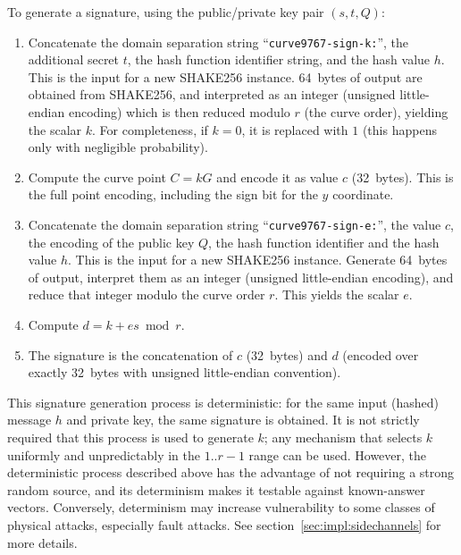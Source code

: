 \documentclass{llncs}
\begin{document}
To generate a signature, using the public/private key pair $(s,t,Q)$:
\begin{enumerate}

    \item Concatenate the domain separation string
    ``\verb+curve9767-sign-k:+'', the additional secret $t$, the hash
    function identifier string, and the hash value $h$. This is the
    input for a new SHAKE256 instance. 64~bytes of output are obtained
    from SHAKE256, and interpreted as an integer (unsigned little-endian
    encoding) which is then reduced modulo $r$ (the curve order),
    yielding the scalar $k$. For completeness, if $k = 0$, it is
    replaced with $1$ (this happens only with negligible probability).

    \item Compute the curve point $C = kG$ and encode it as value $c$
    (32~bytes). This is the full point encoding, including the sign bit
    for the $y$ coordinate.

    \item \label{proc:sign:e}Concatenate the domain separation string
    ``\verb+curve9767-sign-e:+'', the value $c$, the encoding of the
    public key $Q$, the hash function identifier and the hash value $h$.
    This is the input for a new SHAKE256 instance. Generate 64~bytes of
    output, interpret them as an integer (unsigned little-endian encoding),
    and reduce that integer modulo the curve order $r$. This yields the
    scalar $e$.

    \item Compute $d = k + es \bmod r$.

    \item The signature is the concatenation of $c$ (32~bytes) and $d$
    (encoded over exactly 32~bytes with unsigned little-endian
    convention).

\end{enumerate}

This signature generation process is deterministic: for the same input
(hashed) message $h$ and private key, the same signature is obtained. It
is not strictly required that this process is used to generate $k$; any
mechanism that selects $k$ uniformly and unpredictably in the $1$..$r-1$
range can be used. However, the deterministic process described above
has the advantage of not requiring a strong random source, and its
determinism makes it testable against known-answer vectors. Conversely,
determinism may increase vulnerability to some classes of physical
attacks, especially fault attacks. See
section~\ref{sec:impl:sidechannels} for more details.
\end{document}
